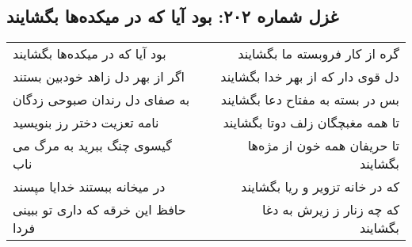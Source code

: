 \begin{center}
\section*{غزل شماره ۲۰۲: بود آیا که در میکده‌ها بگشایند}
\label{sec:sh202}
\begin{longtable}{l p{0.5cm} r}
بود آیا که در میکده‌ها بگشایند
&&
گره از کار فروبسته ما بگشایند
\\
اگر از بهر دل زاهد خودبین بستند
&&
دل قوی دار که از بهر خدا بگشایند
\\
به صفای دل رندان صبوحی زدگان
&&
بس در بسته به مفتاح دعا بگشایند
\\
نامه تعزیت دختر رز بنویسید
&&
تا همه مغبچگان زلف دوتا بگشایند
\\
گیسوی چنگ ببرید به مرگ می ناب
&&
تا حریفان همه خون از مژه‌ها بگشایند
\\
در میخانه ببستند خدایا مپسند
&&
که در خانه تزویر و ریا بگشایند
\\
حافظ این خرقه که داری تو ببینی فردا
&&
که چه زنار ز زیرش به دغا بگشایند
\\
\end{longtable}
\end{center}
